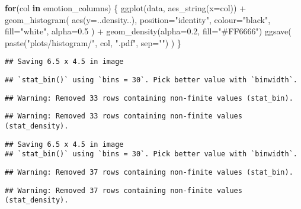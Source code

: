 \documentclass[
]{article}
\newenvironment{Shaded}{\begin{snugshade}}{\end{snugshade}}
\newcommand{\AttributeTok}[1]{\textcolor[rgb]{0.77,0.63,0.00}{#1}}
\newcommand{\ControlFlowTok}[1]{\textcolor[rgb]{0.13,0.29,0.53}{\textbf{#1}}}
\newcommand{\FloatTok}[1]{\textcolor[rgb]{0.00,0.00,0.81}{#1}}
\newcommand{\FunctionTok}[1]{\textcolor[rgb]{0.00,0.00,0.00}{#1}}
\newcommand{\NormalTok}[1]{#1}
\newcommand{\SpecialCharTok}[1]{\textcolor[rgb]{0.00,0.00,0.00}{#1}}
\newcommand{\StringTok}[1]{\textcolor[rgb]{0.31,0.60,0.02}{#1}}
\begin{document}
\begin{Shaded}
\begin{Highlighting}[]
\ControlFlowTok{for}\NormalTok{(col }\ControlFlowTok{in}\NormalTok{ emotion\_columns) \{}
  \FunctionTok{ggplot}\NormalTok{(data, }\FunctionTok{aes\_string}\NormalTok{(}\AttributeTok{x=}\NormalTok{col)) }\SpecialCharTok{+}
    \FunctionTok{geom\_histogram}\NormalTok{(}
      \FunctionTok{aes}\NormalTok{(}\AttributeTok{y=}\NormalTok{..density..),}
      \AttributeTok{position=}\StringTok{"identity"}\NormalTok{,}
      \AttributeTok{colour=}\StringTok{"black"}\NormalTok{, }\AttributeTok{fill=}\StringTok{"white"}\NormalTok{,}
      \AttributeTok{alpha=}\FloatTok{0.5}
\NormalTok{    ) }\SpecialCharTok{+}
    \FunctionTok{geom\_density}\NormalTok{(}\AttributeTok{alpha=}\FloatTok{0.2}\NormalTok{, }\AttributeTok{fill=}\StringTok{"\#FF6666"}\NormalTok{)}
  \FunctionTok{ggsave}\NormalTok{(}
    \FunctionTok{paste}\NormalTok{(}\StringTok{"plots/histogram/"}\NormalTok{, col, }\StringTok{".pdf"}\NormalTok{, }\AttributeTok{sep=}\StringTok{""}\NormalTok{)}
\NormalTok{  )}
\NormalTok{\}}
\end{Highlighting}
\end{Shaded}

\begin{verbatim}
## Saving 6.5 x 4.5 in image
\end{verbatim}

\begin{verbatim}
## `stat_bin()` using `bins = 30`. Pick better value with `binwidth`.
\end{verbatim}

\begin{verbatim}
## Warning: Removed 33 rows containing non-finite values (stat_bin).
\end{verbatim}

\begin{verbatim}
## Warning: Removed 33 rows containing non-finite values (stat_density).
\end{verbatim}

\begin{verbatim}
## Saving 6.5 x 4.5 in image
## `stat_bin()` using `bins = 30`. Pick better value with `binwidth`.
\end{verbatim}

\begin{verbatim}
## Warning: Removed 37 rows containing non-finite values (stat_bin).
\end{verbatim}

\begin{verbatim}
## Warning: Removed 37 rows containing non-finite values (stat_density).
\end{verbatim}
\end{document}
